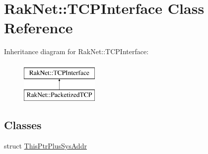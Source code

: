 \hypertarget{class_rak_net_1_1_t_c_p_interface}{\section{Rak\-Net\-:\-:T\-C\-P\-Interface Class Reference}
\label{class_rak_net_1_1_t_c_p_interface}
}
Inheritance diagram for Rak\-Net\-:\-:T\-C\-P\-Interface\-:\begin{figure}[H]
\begin{center}
\leavevmode
\includegraphics[height=2.000000cm]{class_rak_net_1_1_t_c_p_interface}
\end{center}
\end{figure}
\subsection*{Classes}
\begin{DoxyCompactItemize}
\item 
struct \hyperlink{struct_rak_net_1_1_t_c_p_interface_1_1_this_ptr_plus_sys_addr}{This\-Ptr\-Plus\-Sys\-Addr}
\end{DoxyCompactItemize}
